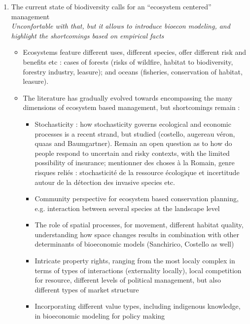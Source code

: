 \begin{enumerate}
\item The current state of biodiversity calls for an ``ecosystem centered'' management\\
\textit{Unconfortable with that, but it allows to introduce bioecon modeling, and highlight the shortcomings based on empirical facts}
\begin{itemize}
\item Ecosystems feature different uses, different species, offer different risk and benefits etc : cases of forests (risks of wildfire, habitat to biodiversity, forestry industry, leasure); and oceans (fisheries, conservation of habitat, leasure).
\item The literature has gradually evolved towards encompassing the many dimensions of ecosystem based management, but shortcomings remain : 
\begin{itemize}
\item Stochasticity : how stochasticity governs ecological and economic processes is a recent strand, but studied (costello, augereau véron, quaas and Baumgartner). Remain an open question as to how do people respond to uncertain and risky contexts, with the limited possibility of insurance; mentionner des choses à la Romain, genre risques reliés : stochasticité de la ressource écologique et incertitude autour de la détection des invasive species etc. 
\item Community perspective for ecosystem based conservation planning, e.g. interaction between several species at the landscape level
\item The role of spatial processes, for movement, different habitat quality, understanding how space changes results in combination with other determinants of bioeconomic models (Sanchirico, Costello as well)
\item Intricate property rights, ranging from the most localy complex in terms of types of interactions (externality locally), local competition for resource, different levels of political management, but also different types of market structure

\item Incorporating different value types, including indigenous knowledge, in bioeconomic modeling for policy making


\end{itemize}
\end{itemize}
\end{enumerate}
